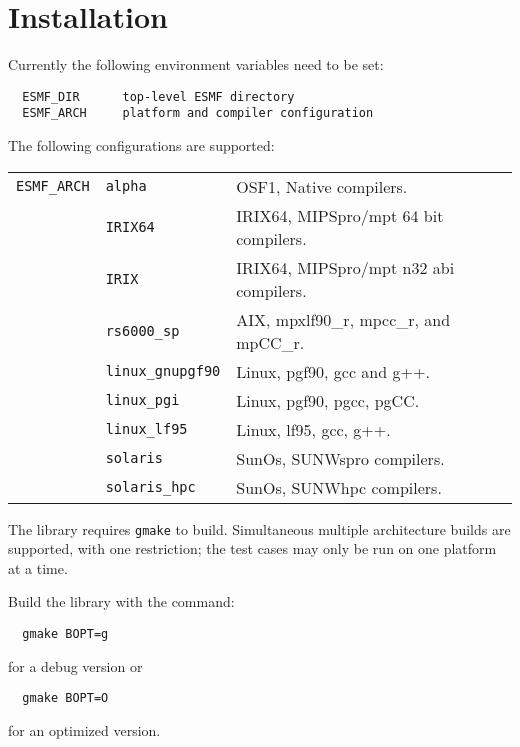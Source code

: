 
\section{Installation}

Currently the following environment variables need to be set:
\begin{verbatim}
  ESMF_DIR      top-level ESMF directory
  ESMF_ARCH     platform and compiler configuration
\end{verbatim}

\noindent The following configurations are supported:

\begin{tabular}{lll}
{\tt ESMF\_ARCH}  & {\tt alpha}      &  OSF1, Native compilers. \\
                  & {\tt IRIX64}     &  IRIX64, MIPSpro/mpt 64 bit compilers. \\
                  & {\tt IRIX}       &  IRIX64, MIPSpro/mpt n32 abi compilers. \\
                  & {\tt rs6000\_sp}  &  AIX, mpxlf90\_r, mpcc\_r, and mpCC\_r.  \\
                  & {\tt linux\_gnupgf90} & Linux, pgf90, gcc and g++.  \\
                  & {\tt linux\_pgi}  &  Linux, pgf90, pgcc, pgCC. \\
                  & {\tt linux\_lf95} &  Linux, lf95, gcc, g++. \\
                  & {\tt solaris}        &  SunOs, SUNWspro compilers. \\
                  & {\tt solaris\_hpc}   &  SunOs, SUNWhpc compilers. \\
\end{tabular}

\smallskip

The library requires {\tt gmake} to build.  Simultaneous multiple architecture builds are supported, with
one restriction; the test cases may only be run on one platform at a time. 

\smallskip

\noindent Build the library with the command:
\begin{verbatim}
  gmake BOPT=g  
\end{verbatim}
  for a debug version or
\begin{verbatim}
  gmake BOPT=O  
\end{verbatim}
  for an optimized version.

